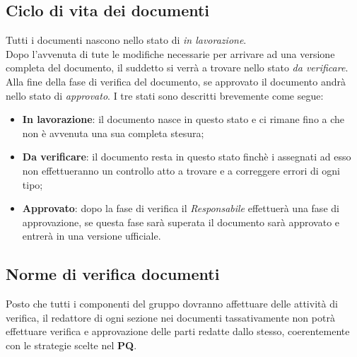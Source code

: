 \subsection{Ciclo di vita dei documenti}
Tutti i documenti nascono nello stato di \textit{in lavorazione}.\\
Dopo l'avvenuta di tute le modifiche necessarie per arrivare ad una versione completa del documento, il suddetto si verrà a trovare nello stato \textit{da verificare}.\\
Alla fine della fase di verifica del documento, se approvato il documento andrà nello stato di \textit{approvato}.
I tre stati sono descritti brevemente come segue:
\begin{itemize}
\item \textbf{In lavorazione}: il documento nasce in questo stato e ci rimane fino a che non è avvenuta una sua completa stesura;
\item \textbf{Da verificare}: il documento resta in questo stato finchè i  assegnati ad esso non effettueranno un controllo atto a trovare e a correggere errori di ogni tipo;
\item \textbf{Approvato}: dopo la fase di verifica il \textit{Responsabile} effettuerà una fase di approvazione, se questa fase sarà superata il documento sarà approvato e entrerà in una versione ufficiale.
\end{itemize}

\subsection{Norme di verifica documenti}
Posto che tutti i componenti del gruppo dovranno affettuare delle attività di
verifica, il redattore di ogni sezione nei documenti tassativamente non potrà
effettuare verifica e approvazione delle parti redatte dallo stesso,
coerentemente con le strategie scelte nel \textbf{PQ}.
